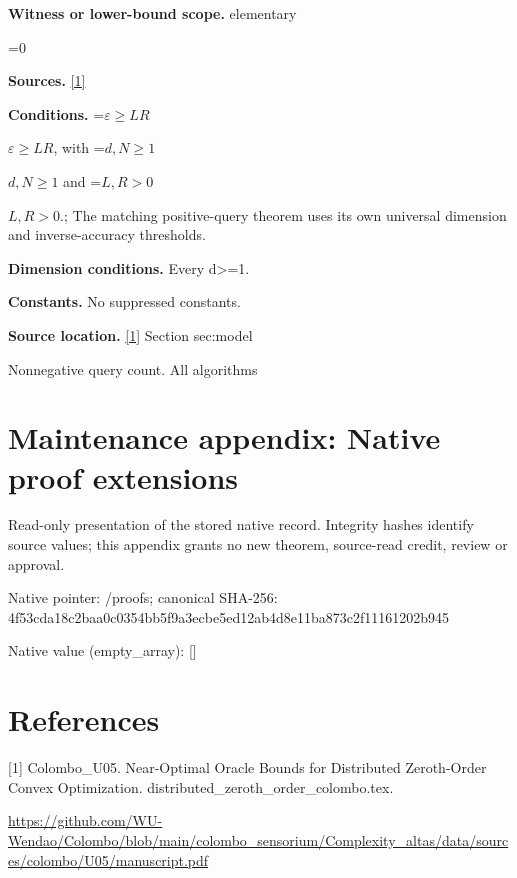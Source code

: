 \documentclass[10pt,a4paper]{article}
\newcommand{\AtlasMath}[1]{\par\begingroup\centering\setbox0=\hbox{$\displaystyle #1$}\ifdim\wd0>1.4\linewidth\typeout{ATLAS WIDE FORMULA: \the\wd0}\fi\ifdim\wd0>\linewidth\resizebox{\linewidth}{!}{\box0}\else\box0\fi\par\endgroup}
\newcommand{\AtlasInlineMath}[1]{\begingroup\setbox0=\hbox{$#1$}\ifdim\wd0>.4\linewidth\endgroup\AtlasMath{#1}\else\endgroup$#1$\fi}
\begin{document}
\textbf{Witness or lower-bound scope.} elementary



\AtlasMath{0}


\textbf{Sources.} \href{https://github.com/WU-Wendao/Colombo/blob/main/colombo_sensorium/Complexity_altas/data/sources/colombo/U05/manuscript.pdf}{[1]}



\textbf{Conditions.} \AtlasInlineMath{\varepsilon\ge LR}, with \AtlasInlineMath{d,N\ge1} and \AtlasInlineMath{L,R>0}.; The matching positive-query theorem uses its own universal dimension and inverse-accuracy thresholds.



\textbf{Dimension conditions.} Every d>=1.



\textbf{Constants.} No suppressed constants.



\textbf{Source location.} \href{https://github.com/WU-Wendao/Colombo/blob/main/colombo_sensorium/Complexity_altas/data/sources/colombo/U05/manuscript.pdf}{[1]} Section sec:model



Nonnegative query count. All algorithms



\section{Maintenance appendix: Native proof extensions}


Read-only presentation of the stored native record. Integrity hashes identify source values; this appendix grants no new theorem, source-read credit, review or approval.



Native pointer: /proofs; canonical SHA-256: 4f53cda18c2baa0c0354bb5f\allowbreak{}9a3ecbe5ed12ab4d8e11ba87\allowbreak{}3c2f11161202b945



Native value (empty\_array): []



\section{References}


[1] Colombo\_U05. Near-Optimal Oracle Bounds for Distributed Zeroth-Order Convex Optimization. distributed\_zeroth\_order\_colombo.tex.



\url{https://github.com/WU-Wendao/Colombo/blob/main/colombo_sensorium/Complexity_altas/data/sources/colombo/U05/manuscript.pdf}
\end{document}

